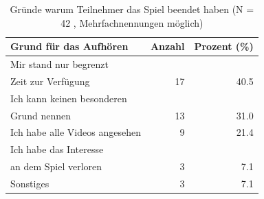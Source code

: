 \begin{table}[htbp]
\centering
\caption{Gründe warum Teilnehmer das Spiel beendet haben (N = 42 , Mehrfachnennungen möglich)} 
\label{tab:stop_reasons}
\begin{tabular}{lrr}
  \toprule
Grund für das Aufhören & Anzahl & Prozent (\%) \\ 
  \midrule
Mir stand nur begrenzt\\Zeit zur Verfügung & 17 & 40.5 \\ 
  Ich kann keinen besonderen\\Grund nennen & 13 & 31.0 \\ 
  Ich habe alle Videos angesehen & 9 & 21.4 \\ 
  Ich habe das Interesse\\an dem Spiel verloren & 3 & 7.1 \\ 
  Sonstiges & 3 & 7.1 \\ 
   \bottomrule
\end{tabular}
\end{table}